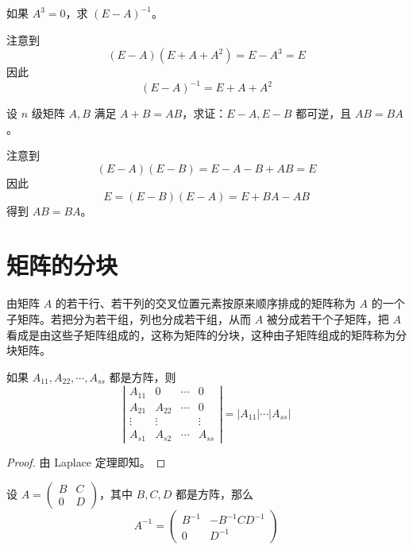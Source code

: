 \begin{example}
	如果 $A^3 = 0$，求 $(E - A)^{-1}$。
\end{example}

\begin{solution}
	注意到
	\[ (E - A)(E + A + A^2) = E - A^3 = E \]
	因此
	\[ (E - A)^{-1} = E + A + A^2 \]
\end{solution}

\begin{example}
	设 $n$ 级矩阵 $A, B$ 满足 $A + B = AB$，求证：$E - A, E - B$ 都可逆，且 $AB = BA$。
\end{example}

\begin{solution}
	注意到
	\[ (E-A)(E-B) = E - A - B + AB = E \]
	因此
	\[ E = (E-B)(E-A) = E + BA - AB \]
	得到 $AB = BA$。
\end{solution}

\section{矩阵的分块}

由矩阵 $A$ 的若干行、若干列的交叉位置元素按原来顺序排成的矩阵称为 $A$ 的一个子矩阵。若把分为若干组，列也分成若干组，从而 $A$ 被分成若干个子矩阵，把 $A$ 看成是由这些子矩阵组成的，这称为矩阵的分块，这种由子矩阵组成的矩阵称为分块矩阵。

\begin{theorem}
	如果 $A_{11}, A_{22}, \cdots, A_{ss}$ 都是方阵，则
	\[ \left| \begin{matrix}
			A_{11} & 0      & \cdots & 0      \\
			A_{21} & A_{22} & \cdots & 0      \\
			\vdots & \vdots &        & \vdots \\
			A_{s1} & A_{s2} & \cdots & A_{ss}
		\end{matrix} \right| = |A_{11}| \cdots |A_{ss}| \]
\end{theorem}

\begin{proof}
	由 Laplace 定理即知。
\end{proof}

\begin{theorem}
	设 $A = \left(\begin{matrix} B & C\\ 0 & D \end{matrix}\right)$，其中 $B,C,D$ 都是方阵，那么
	\[A^{-1} = \left(\begin{matrix} B^{-1} & -B^{-1}CD^{-1}\\ 0 & D^{-1} \end{matrix}\right)\]
\end{theorem}

